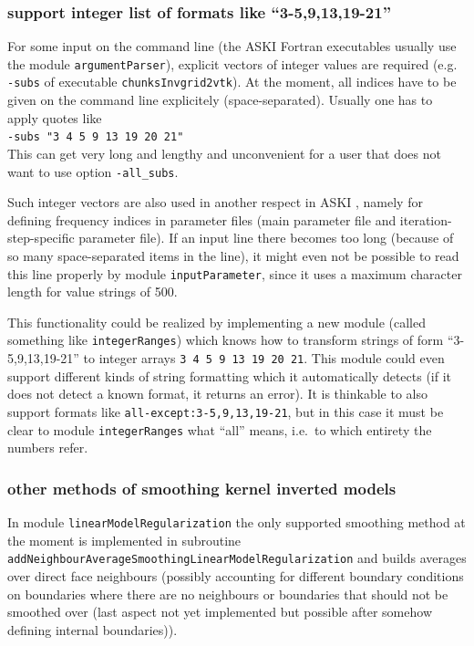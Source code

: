 \documentclass[12pt,a4paper]{article}
\newcommand{\lcode}[1]{\nolinkurl{#1}}
\newcommand{\ASKI}{ {\ttfamily ASKI} }
\begin{document}
\subsubsection{support integer list of formats like ``3-5,9,13,19-21''}
For some input on the command line (the \ASKI{} Fortran executables usually use the module \lcode{argumentParser}), 
explicit vectors of integer values are required (e.g. \lcode{-subs} of executable \lcode{chunksInvgrid2vtk}). At 
the moment, all indices have to be given on the command line explicitely (space-separated). Usually one has to apply 
quotes like \\
\lcode{-subs "3 4 5 9 13 19 20 21"}\\
This can get very long and lengthy and unconvenient for a user that does not want to use option \lcode{-all_subs}.

Such integer vectors are also used in another respect in \ASKI{}, namely for defining frequency indices in 
parameter files (main parameter file and iteration-step-specific parameter file). If an input line there
becomes too long (because of so many space-separated items in the line), it might even not be possible to read 
this line properly by module \lcode{inputParameter}, since it uses a maximum character length for value strings
of 500.

This functionality could be realized by implementing a new module (called something like \lcode{integerRanges})
which knows how to transform strings of form ``3-5,9,13,19-21'' to integer arrays \lcode{3 4 5 9 13 19 20 21}.
This module could even support different kinds of string formatting which it automatically detects (if it does
not detect a known format, it returns an error).
It is thinkable to also support formats like \lcode{all-except:3-5,9,13,19-21}, but in this case it must be clear
to module \lcode{integerRanges} what ``all'' means, i.e.\ to which entirety the numbers refer.

\subsubsection{other methods of smoothing kernel inverted models}
In module \lcode{linearModelRegularization} the only supported smoothing method at the moment is implemented in subroutine 
\lcode{addNeighbourAverageSmoothingLinearModelRegularization} and builds averages over direct face neighbours
(possibly accounting for different boundary conditions on boundaries where there are no neighbours or boundaries
that should not be smoothed over (last aspect not yet implemented but possible after somehow defining internal 
boundaries)).
\end{document}

